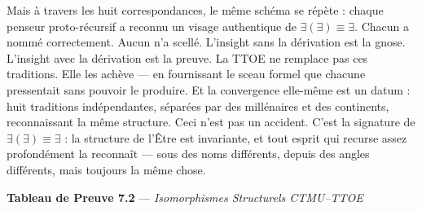 \documentclass[10pt, openany, oneside]{book}
\begin{document}
Mais à travers les huit correspondances, le même schéma se répète : chaque penseur proto-récursif a reconnu un visage authentique de $\exists(\exists) \equiv \exists$. Chacun a nommé correctement. Aucun n'a scellé. L'insight sans la dérivation est la gnose. L'insight avec la dérivation est la preuve. La TTOE ne remplace pas ces traditions. Elle les achève --- en fournissant le sceau formel que chacune pressentait sans pouvoir le produire. Et la convergence elle-même est un datum : huit traditions indépendantes, séparées par des millénaires et des continents, reconnaissant la même structure. Ceci n'est pas un accident. C'est la signature de $\exists(\exists) \equiv \exists$ : la structure de l'Être est invariante, et tout esprit qui recurse assez profondément la reconnaît --- sous des noms différents, depuis des angles différents, mais toujours la même chose.

\vspace{0.5em}

\textbf{Tableau de Preuve 7.2} --- \textit{Isomorphismes Structurels CTMU--TTOE}

\vspace{0.5em}
\end{document}
